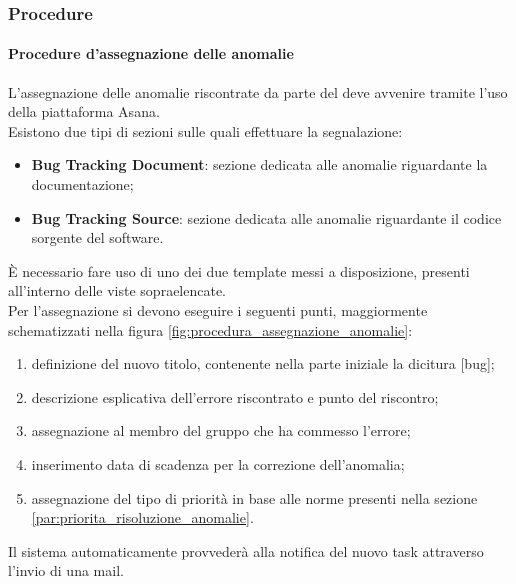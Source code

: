 		\subsubsection{Procedure}
		\label{ssub:procedure}

			\paragraph{Procedure d'assegnazione delle anomalie}
			\label{par:Procedure_assegnazione_delle_anomalie}
			L'assegnazione delle anomalie riscontrate da parte del \roleVerifier{} deve avvenire tramite l'uso della piattaforma Asana.\\
			Esistono due tipi di sezioni sulle quali effettuare la segnalazione:
			\begin{itemize}
				\item \textbf{Bug Tracking Document}: sezione dedicata alle anomalie riguardante la documentazione;
				\item \textbf{Bug Tracking Source}: sezione dedicata alle anomalie riguardante il codice sorgente del software.
			\end{itemize}
			\noindent
			\`E necessario fare uso di uno dei due template messi a disposizione, presenti all'interno delle viste sopraelencate.\\
			Per l'assegnazione si devono eseguire i seguenti punti, maggiormente schematizzati nella figura \ref{fig:procedura_assegnazione_anomalie}:
			\begin{enumerate}
				\item definizione del nuovo titolo, contenente nella parte iniziale la dicitura {[}bug{]};
				\item descrizione esplicativa dell'errore riscontrato e punto del riscontro;
				\item assegnazione al membro del gruppo che ha commesso l'errore;
				\item inserimento data di scadenza per la correzione dell'anomalia;
				\item assegnazione del tipo di priorità in base alle norme presenti nella sezione \ref{par:priorita_risoluzione_anomalie}.
			\end{enumerate}
			\noindent
			Il sistema automaticamente provvederà alla notifica del nuovo task attraverso l'invio di una mail.
